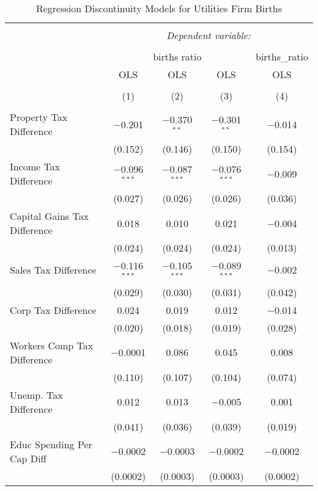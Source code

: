 
\begin{table}[!htbp] \centering 
  \caption{Regression Discontinuity Models for  Utilities Firm Births} 
  \label{22rd} 
\begin{tabular}{@{\extracolsep{5pt}}lcccc} 
\\[-1.8ex]\hline 
\hline \\[-1.8ex] 
 & \multicolumn{4}{c}{\textit{Dependent variable:}} \\ 
\cline{2-5} 
\\[-1.8ex] & \multicolumn{3}{c}{births ratio} & births\_ratio \\ 
 & OLS & OLS & OLS & OLS \\ 
\\[-1.8ex] & (1) & (2) & (3) & (4)\\ 
\hline \\[-1.8ex] 
 Property Tax Difference & $-$0.201 & $-$0.370$^{**}$ & $-$0.301$^{**}$ & $-$0.014 \\ 
  & (0.152) & (0.146) & (0.150) & (0.154) \\ 
  Income Tax Difference & $-$0.096$^{***}$ & $-$0.087$^{***}$ & $-$0.076$^{***}$ & $-$0.009 \\ 
  & (0.027) & (0.026) & (0.026) & (0.036) \\ 
  Capital Gains Tax Difference & 0.018 & 0.010 & 0.021 & $-$0.004 \\ 
  & (0.024) & (0.024) & (0.024) & (0.013) \\ 
  Sales Tax Difference & $-$0.116$^{***}$ & $-$0.105$^{***}$ & $-$0.089$^{***}$ & $-$0.002 \\ 
  & (0.029) & (0.030) & (0.031) & (0.042) \\ 
  Corp Tax Difference & 0.024 & 0.019 & 0.012 & $-$0.014 \\ 
  & (0.020) & (0.018) & (0.019) & (0.028) \\ 
  Workers Comp Tax Difference & $-$0.0001 & 0.086 & 0.045 & 0.008 \\ 
  & (0.110) & (0.107) & (0.104) & (0.074) \\ 
  Unemp. Tax Difference & 0.012 & 0.013 & $-$0.005 & 0.001 \\ 
  & (0.041) & (0.036) & (0.039) & (0.019) \\ 
  Educ Spending Per Cap Diff & $-$0.0002 & $-$0.0003 & $-$0.0002 & $-$0.0002 \\ 
  & (0.0002) & (0.0003) & (0.0003) & (0.0002) \\ 

\end{tabular}
\end{table}
